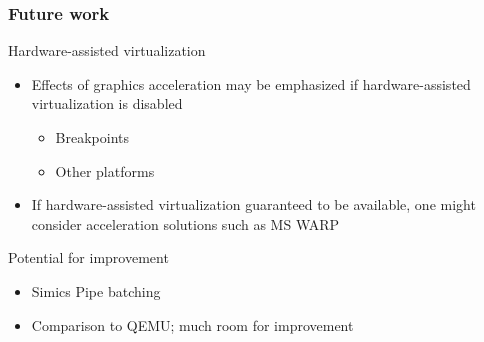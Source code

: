 \begin{frame}

\frametitle{Future work}

\begin{block}{Hardware-assisted virtualization}
	\begin{itemize}
		\item Effects of graphics acceleration may be emphasized if hardware-assisted virtualization is disabled
		\begin{itemize}
			\item Breakpoints
			\item Other platforms
		\end{itemize}
		\item If hardware-assisted virtualization guaranteed to be available, one might consider acceleration solutions such as MS WARP
	\end{itemize}
\end{block}

\begin{block}{Potential for improvement}
	\begin{itemize}
		\item Simics Pipe batching
		\item Comparison to QEMU; much room for improvement
	\end{itemize}
\end{block}

\end{frame}
